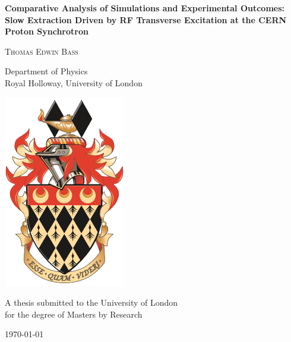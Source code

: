 \begin{titlepage}

\center

\vspace*{0.1cm}

\begin{spacing}{2}

{ \LARGE \bfseries Comparative Analysis of Simulations and Experimental Outcomes: Slow Extraction Driven by RF Transverse Excitation at the CERN Proton Synchrotron}\\[0.4cm] 


\vspace{0.7cm}

\textsc{\Large Thomas Edwin Bass}\\[0.5cm]

\end{spacing}
\begin{spacing}{1.5}
{\Large Department of Physics\\
Royal Holloway, University of London}\\[1.5cm]
\end{spacing}

\includegraphics[width=0.35\linewidth]{Royal_Holloway_coat_of_arms.png}\\[1cm] %
\begin{spacing}{1.5}
\begin{center}
    {\Large A thesis submitted to the University of London\\for the degree of Masters by Research}\\[1cm]
\end{center}
\vspace{1cm}
{\large \today}
\end{spacing}


\end{titlepage}

